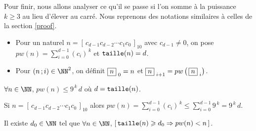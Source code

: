 Pour finir, nous allons analyser ce qu'il se passe si l'on somme à la puissance $k \geqslant 3$ au lieu d'élever au carré.
Nous reprenons des notations similaires à celles de la section \ref{proof}.
\begin{itemize}[label = \textbullet]
    \item Pour un naturel $n =  \left[ \, c_{d-1} c_{d-2} \cdots c_1 c_0 \, \right]_{10}$ avec $c_{d-1} \neq 0$,
    on pose
    $\displaystyle pw(n) = \sum_{i=0}^{d-1} (c_i)^{\,k}$
    et
    $\operatorname{\text{\normalfont\texttt{taille}}}(n) = d$.

    \item Pour $(n \,; i) \in \NN^2$, on définit
    $\fbox{$n$}_{\,\,0} = n$
    et
    $\fbox{$n$}_{\,\,i+1} = pw \left( \, \fbox{$n$}_{\,\,i} \right)$.
\end{itemize}



\bigskip

\begin{fact}
    $\forall n \in \NN$, $pw(n) \leqslant 9^{\,k} \, d$ où $d = \operatorname{\text{\normalfont\texttt{taille}}}(n)$.
\end{fact}

\begin{proof*}
    Si $n = \left[ \, c_{d-1} c_{d-2} \cdots c_1 c_0 \, \right]_{10}$
    alors
    $\displaystyle pw(n) = \sum_{i=0}^{d-1} (c_i)^{\,k} \leqslant \sum_{i=0}^{d-1} 9^{\,k} = 9^{\,k} \, d $.
\end{proof*}




\medskip

\begin{fact}\label{magicmajo}
    Il existe $d_0 \in \NN$ tel que $\forall n \in \NN$,
    $[ \, \operatorname{\text{\normalfont\texttt{taille}}}(n) \geqslant d_0 \Rightarrow pw(n) < n \, ]$.
\end{fact}

